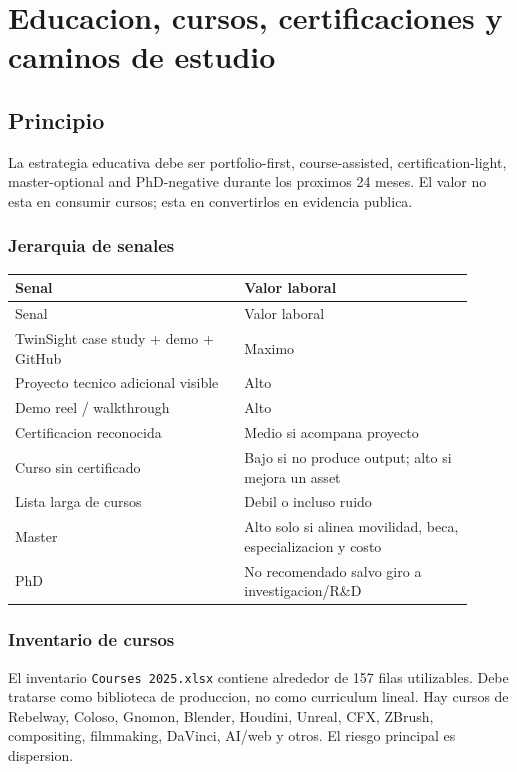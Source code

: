\chapter{Educacion, cursos, certificaciones y caminos de estudio}

\section{Principio}


La estrategia educativa debe ser portfolio-first, course-assisted, certification-light, master-optional and PhD-negative durante los proximos 24 meses. El valor no esta en consumir cursos; esta en convertirlos en evidencia publica.


\subsection{Jerarquia de senales}


\begin{center}
\scriptsize
\begin{longtable}{>{\raggedright\arraybackslash}p{0.455\linewidth} >{\raggedright\arraybackslash}p{0.455\linewidth}}
\toprule
Senal & Valor laboral \\
\midrule
\endfirsthead
\toprule
Senal & Valor laboral \\
\midrule
\endhead
TwinSight case study + demo + GitHub & Maximo \\
Proyecto tecnico adicional visible & Alto \\
Demo reel / walkthrough & Alto \\
Certificacion reconocida & Medio si acompana proyecto \\
Curso sin certificado & Bajo si no produce output; alto si mejora un asset \\
Lista larga de cursos & Debil o incluso ruido \\
Master & Alto solo si alinea movilidad, beca, especializacion y costo \\
PhD & No recomendado salvo giro a investigacion/R\&D \\
\bottomrule
\end{longtable}
\end{center}


\subsection{Inventario de cursos}


El inventario \texttt{Courses 2025.xlsx} contiene alrededor de 157 filas utilizables. Debe tratarse como biblioteca de produccion, no como curriculum lineal. Hay cursos de Rebelway, Coloso, Gnomon, Blender, Houdini, Unreal, CFX, ZBrush, compositing, filmmaking, DaVinci, AI/web y otros. El riesgo principal es dispersion.


